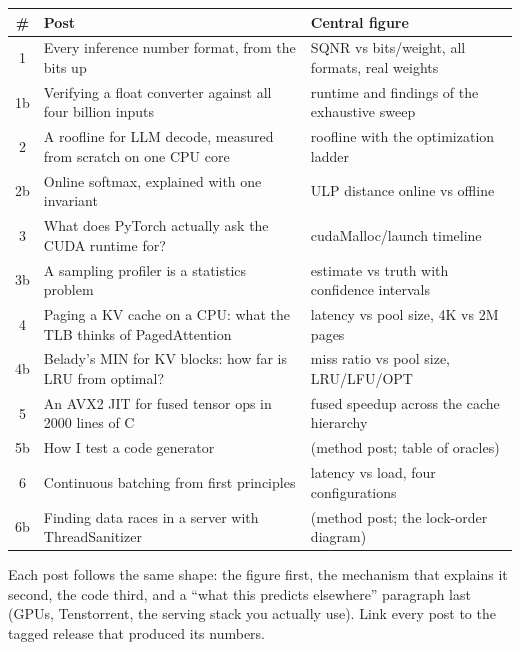 \begin{center}\small
\begin{tabularx}{\textwidth}{@{}c>{\raggedright\arraybackslash}X>{\raggedright\arraybackslash}p{}@{}}
\toprule
\# & Post & Central figure \\
\midrule
1 & Every inference number format, from the bits up & SQNR vs bits/weight, all formats, real weights \\
1b & Verifying a float converter against all four billion inputs & runtime and findings of the exhaustive sweep \\
2 & A roofline for LLM decode, measured from scratch on one CPU core & roofline with the optimization ladder \\
2b & Online softmax, explained with one invariant & ULP distance online vs offline \\
3 & What does PyTorch actually ask the CUDA runtime for? & cudaMalloc/launch timeline \\
3b & A sampling profiler is a statistics problem & estimate vs truth with confidence intervals \\
4 & Paging a KV cache on a CPU: what the TLB thinks of PagedAttention & latency vs pool size, 4K vs 2M pages \\
4b & Belady's MIN for KV blocks: how far is LRU from optimal? & miss ratio vs pool size, LRU/LFU/OPT \\
5 & An AVX2 JIT for fused tensor ops in 2000 lines of C & fused speedup across the cache hierarchy \\
5b & How I test a code generator & (method post; table of oracles) \\
6 & Continuous batching from first principles & latency vs load, four configurations \\
6b & Finding data races in a server with ThreadSanitizer & (method post; the lock-order diagram) \\
\bottomrule
\end{tabularx}
\end{center}

Each post follows the same shape: the figure first, the mechanism that explains it second, the code third, and a ``what this predicts elsewhere'' paragraph last (GPUs, Tenstorrent, the serving stack you actually use). Link every post to the tagged release that produced its numbers.

